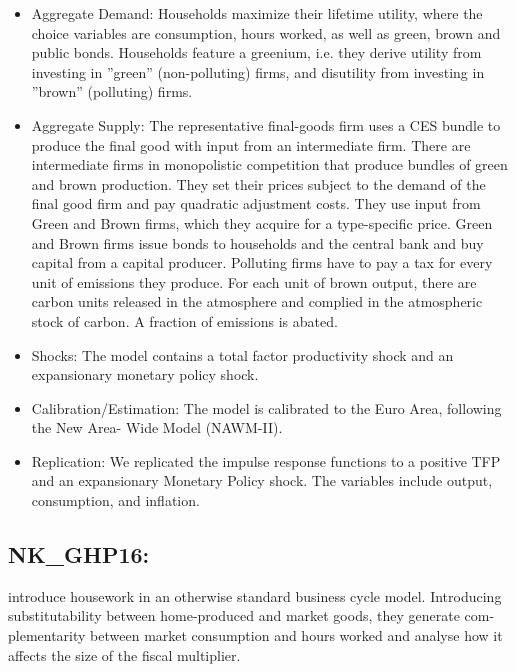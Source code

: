\documentclass[11pt,a4paper]{article}
\begin{document}
	\begin{itemize}
	\item Aggregate Demand: Households maximize their lifetime utility, where the choice variables are consumption, hours worked, as well as green, brown and public bonds. Households feature a greenium, i.e. they derive utility from investing in ”green” (non-polluting) firms, and disutility from investing in ”brown” (polluting) firms.
	
	\item Aggregate Supply: The representative final-goods firm uses a CES bundle to produce the final good with input from an intermediate firm. There are intermediate firms in monopolistic competition that produce bundles of green and brown production. They set their prices subject to the demand of the final good firm and pay quadratic adjustment costs. They use input from Green and Brown firms, which they acquire for a type-specific price. Green and Brown firms issue bonds to households and the central bank and buy capital from a capital producer. Polluting firms have to pay a tax for every unit of emissions they produce. For each unit of brown output, there are carbon units released in the atmosphere and complied in the atmospheric stock of carbon. A fraction of emissions is abated.
	
	\item Shocks: The model contains a total factor productivity shock and an expansionary monetary policy shock.
	
	\item Calibration/Estimation: The model is calibrated to the Euro Area, following the New Area- Wide Model (NAWM-II). 
	
	\item Replication: We replicated the impulse response functions to a positive TFP and an expansionary Monetary Policy shock. The variables include output, consumption, and inflation.
	\end{itemize}
	
	\subsection{NK\_GHP16: \texorpdfstring{\cite{gnocci2016housework}}{Gnocci and Pappa (2016)}}
	\label{NKGHP16}
	\cite{gnocci2016housework} introduce housework in an otherwise standard business cycle model. Introducing substitutability between home-produced and market goods, they generate com-plementarity between market consumption and hours worked and analyse how it affects the size of the fiscal multiplier.
	
\end{document}
